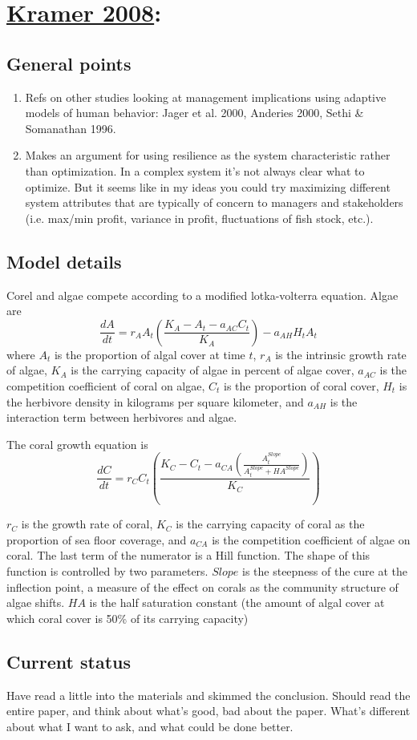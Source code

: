 \documentclass[a4paper,10pt]{article}
\begin{document}
\section*{ \href{run:Adaptive harvesting in a multiple-species coral-re.pdf alias}{\color{Blue}Kramer 2008}:}
\subsection*{General points}
\begin{enumerate}
\item Refs on other studies looking at management implications using adaptive models of human behavior: Jager et al. 2000, Anderies 2000, Sethi \& Somanathan 1996. 
\item Makes an argument for using resilience as the system characteristic rather than optimization. In a complex system it's not always clear what to optimize. But it seems like in my ideas you could try maximizing different system attributes that are typically of concern to managers and stakeholders (i.e. max/min profit, variance in profit, fluctuations of fish stock, etc.). 
\end{enumerate}

\subsection*{Model details}
Corel and algae compete according to a modified lotka-volterra equation. Algae are 
\[ \frac{dA}{dt} = r_AA_t\left(\frac{K_A - A_t - a_{AC}C_t}{K_A}\right) - a_{AH}H_tA_t\]
where $A_t$ is the proportion of algal cover at time $t$, $r_A$ is the intrinsic growth rate of algae, $K_A$ is the carrying capacity of algae in percent of algae cover, $a_{AC}$ is the competition coefficient of coral on algae, $C_t$ is the proportion of coral cover, $H_t$ is the herbivore density in kilograms per square kilometer, and $a_{AH}$ is the interaction term between herbivores and algae. 

The coral growth equation is 
\[\frac{dC}{dt} = r_CC_t\left(\frac{K_C-C_t-a_{CA}\left(\frac{A_t^{Slope}}{A_t^{Slope}+HA^{Slope}}\right)}{K_C}\right)\]

$r_C$ is the growth rate of coral, $K_C$ is the carrying capacity of coral as the proportion of sea floor coverage, and $a_{CA}$ is the competition coefficient of algae on coral. The last term of the numerator is a Hill function. The shape of this function is controlled by two parameters. $Slope$ is the steepness of the cure at the inflection point, a measure of the effect on corals as the community structure of algae shifts. $HA$ is the half saturation constant (the amount of algal cover at which coral cover is 50\% of its carrying capacity)


\subsection*{Current status}
Have read a little into the materials and skimmed the conclusion. Should read the entire paper, and think about what's good, bad about the paper. What's different about what I want to ask, and what could be done better. 


\end{document}
